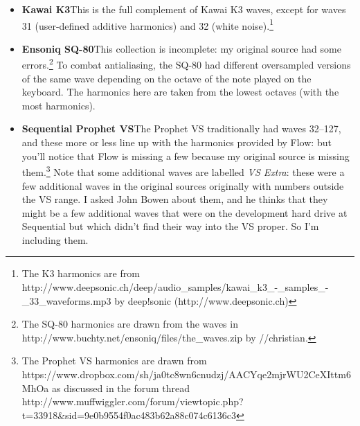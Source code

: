 \documentclass{article}
\begin{document}
\begin{itemize}

\item{\bf Kawai K3}\quad This is the full complement of Kawai K3 waves, except for waves 31 (user-defined additive harmonics) and 32 (white noise).\footnote{The K3 harmonics are from http:/\!/www.deepsonic.ch/deep/audio\_samples/kawai\_k3\_-\_samples\_-\_33\_waveforms.mp3 by deep!sonic (http:/\!/www.deepsonic.ch)}
 
\item{\bf Ensoniq SQ-80}\quad   This collection is incomplete: my original source had some errors.\footnote{The SQ-80 harmonics are drawn from the waves in http:/\!/www.buchty.net/ensoniq/files/the\_waves.zip by /\!/christian.}  To combat antialiasing, the SQ-80 had different oversampled versions of the same wave depending on the octave of the note played on the keyboard.  The harmonics here are taken from the lowest octaves (with the most harmonics).

\item{\bf Sequential Prophet VS}\quad The Prophet VS traditionally had waves 32--127, and these more or less line up with the harmonics provided by Flow: but you'll notice that Flow is missing a few because my original source is missing them.\footnote{The Prophet VS harmonics are drawn from https:/\!/www.dropbox.com/sh/ja0tc8wn6cnudzj/AACYqe2mjrWU2CeXIttm6MhOa as discussed in the forum thread http:/\!/www.muffwiggler.com/forum/viewtopic.php?t=33918\&sid=9e0b9554f0ac483b62a88c074c6136c3}  Note that some additional waves are labelled {\it VS Extra}: these were a few additional waves in the original sources originally with numbers outside the VS range.  I asked John Bowen about them, and he thinks that they might be a few additional waves that were on the development hard drive at Sequential but which didn't find their way into the VS proper.  So I'm including them.


\end{itemize}
\end{document}
